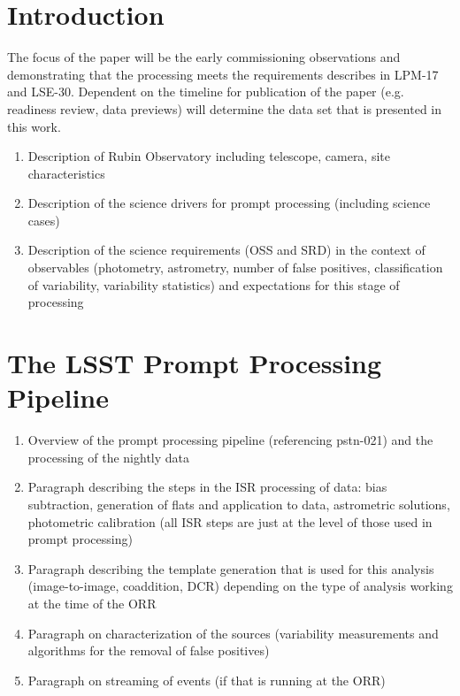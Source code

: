 
\section{Introduction}

The focus of the paper will be the early commissioning observations and demonstrating that the processing 
meets the requirements describes in  LPM-17 and LSE-30. Dependent on the timeline for publication of the 
paper (e.g. readiness review, data previews) will determine the data set that is presented in this work.

\begin{enumerate}

\item Description of Rubin Observatory including telescope, camera, site characteristics 
\item Description of the science drivers for prompt processing (including science cases) 
\item Description of the science requirements (OSS and SRD) in the context of observables (photometry, astrometry, number of false positives, 
classification of variability, variability statistics) and expectations for this stage of processing

\end{enumerate}

\section{The LSST Prompt Processing Pipeline} 

\begin{enumerate}

    \item Overview of the prompt processing pipeline (referencing pstn-021) and the processing of the nightly data
    \item Paragraph describing the steps in the ISR processing of data: bias subtraction, generation of flats and application to data, 
    astrometric solutions, photometric calibration (all ISR steps are just at the level of those used in prompt processing)
    \item Paragraph describing the template generation that is used for this analysis (image-to-image, coaddition, DCR) depending on the 
    type of analysis working at the time of the ORR
    \item Paragraph on characterization of the sources (variability measurements and algorithms for the removal of false positives)
    \item Paragraph on streaming of events (if that is running at the ORR)
    
\end{enumerate}

